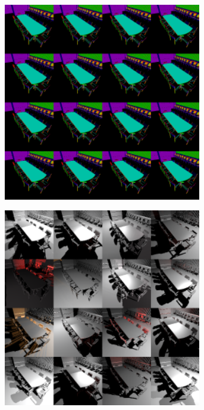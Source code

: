 \begin{figure}[htb]
\begin{subfigure}[b]{0.33\textwidth}
             \includegraphics[width=0.95\textwidth]{graphics/interleaved_segovia_2}
             \caption{}
             \label{fig:concept:interleaved_segovia_2}
             \end{subfigure}%
             \begin{subfigure}[b]{0.33\textwidth}
                 \centering
                 \includegraphics[width=0.95\textwidth]{graphics/interleaved_segovia_3}

\end{subfigure}
\end{figure}
